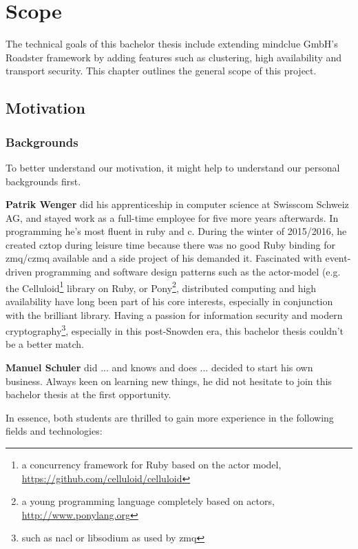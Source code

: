 \chapter{Scope}
The technical goals of this bachelor thesis include extending mindclue GmbH's
Roadster framework by adding features such as clustering, high availability and
transport security. This chapter outlines the general scope of this project.

\section{Motivation}

\subsection*{Backgrounds}
To better understand our motivation, it might help to understand our personal
backgrounds first.

\textbf{Patrik Wenger} did his apprenticeship in computer science at Swisscom
Schweiz AG, and stayed work as a full-time employee for five more years
afterwards. In programming he's most fluent in \gls{ruby} and \gls{c}. During
the winter of 2015/2016, he created \gls{cztop} during leisure time because
there was no good Ruby binding for \gls{zmq}/\gls{czmq} available and a side
project of his demanded it. Fascinated with event-driven programming and
software design patterns such as the \gls{actor-model} (e.g. the
Celluloid\footnote{a concurrency framework for Ruby based on the actor model,
\url{https://github.com/celluloid/celluloid}} library on Ruby, or
Pony\footnote{a young programming language completely based on actors,
\url{http://www.ponylang.org}}, distributed computing and high availability
have long been part of his core interests, especially in conjunction with the
brilliant \zmq library. Having a passion for information security and modern
cryptography\footnote{such as \gls{nacl} or \gls{libsodium} as used by
\gls{zmq}}, especially in this post-Snowden era, this bachelor thesis couldn't
be a better match.

\textbf{Manuel Schuler} did ... and knows and does ... decided to start his own business.
Always keen on learning new things, he did not hesitate to join
this bachelor thesis at the first opportunity.

\noindent
In essence, both students are thrilled to gain more experience in the following
fields and technologies:

